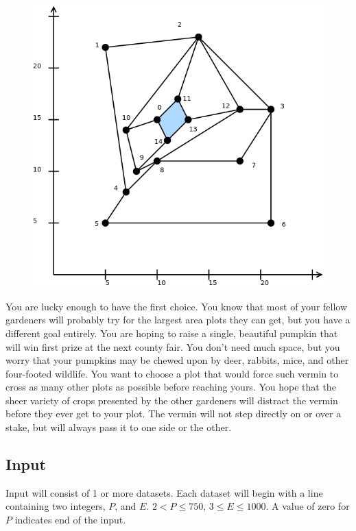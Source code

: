 \begin{figure}
\includegraphics[width=\linewidth]{Gardener/plots1}
\end{figure}

You are lucky enough to have the first choice. You know that most of
your fellow gardeners will probably try for the largest area plots
they can get, but you have a different goal entirely. You are hoping
to raise a single, beautiful pumpkin that will win first prize at the
next county fair. You don't need much space, but you worry that your
pumpkins may be chewed upon by deer, rabbits, mice, and other
four-footed wildlife. You want to choose a plot that would force such
vermin to cross as many other plots as possible before reaching
yours. You hope that the sheer variety of crops presented by the other
gardeners will distract the vermin before they ever get to your plot. 
The vermin will not step directly on or over a stake, but will
always pass it to one side or the other.


\subsection*{Input}

Input will consist of 1 or more datasets.  Each dataset will begin
with a line containing two integers, $P$, and $E$. $2 < P \leq 750$, 
$3 \leq E \leq 1000$. A value of zero for $P$ indicates end of the input.

